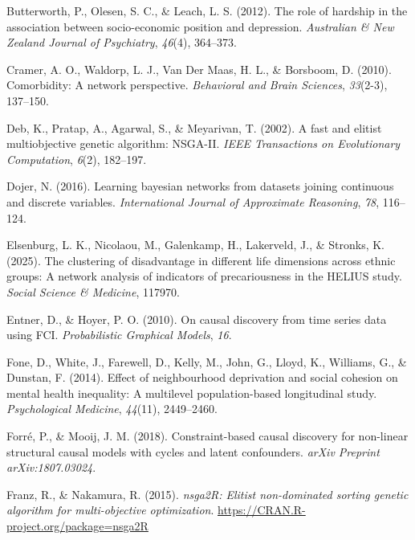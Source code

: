\documentclass[
]{article}
\newlength{\cslhangindent}
\newenvironment{CSLReferences}[2] %
 {\begin{list}{}{%
  \setlength{\itemindent}{0pt}
  \setlength{\leftmargin}{0pt}
  \setlength{\parsep}{0pt}
  \ifodd #1
   \setlength{\leftmargin}{\cslhangindent}
   \setlength{\itemindent}{-1\cslhangindent}
  \fi
  \setlength{\itemsep}{#2\baselineskip}}}
 {\end{list}}
\begin{document}
\label{refs}
\begin{CSLReferences}{1}{0}
Butterworth, P., Olesen, S. C., \& Leach, L. S. (2012). The role of
hardship in the association between socio-economic position and
depression. \emph{Australian \& New Zealand Journal of Psychiatry},
\emph{46}(4), 364--373.

Cramer, A. O., Waldorp, L. J., Van Der Maas, H. L., \& Borsboom, D.
(2010). Comorbidity: A network perspective. \emph{Behavioral and Brain
Sciences}, \emph{33}(2-3), 137--150.

Deb, K., Pratap, A., Agarwal, S., \& Meyarivan, T. (2002). A fast and
elitist multiobjective genetic algorithm: NSGA-II. \emph{IEEE
Transactions on Evolutionary Computation}, \emph{6}(2), 182--197.

Dojer, N. (2016). Learning bayesian networks from datasets joining
continuous and discrete variables. \emph{International Journal of
Approximate Reasoning}, \emph{78}, 116--124.

Elsenburg, L. K., Nicolaou, M., Galenkamp, H., Lakerveld, J., \&
Stronks, K. (2025). The clustering of disadvantage in different life
dimensions across ethnic groups: A network analysis of indicators of
precariousness in the HELIUS study. \emph{Social Science \& Medicine},
117970.

Entner, D., \& Hoyer, P. O. (2010). On causal discovery from time series
data using FCI. \emph{Probabilistic Graphical Models}, \emph{16}.

Fone, D., White, J., Farewell, D., Kelly, M., John, G., Lloyd, K.,
Williams, G., \& Dunstan, F. (2014). Effect of neighbourhood deprivation
and social cohesion on mental health inequality: A multilevel
population-based longitudinal study. \emph{Psychological Medicine},
\emph{44}(11), 2449--2460.

Forré, P., \& Mooij, J. M. (2018). Constraint-based causal discovery for
non-linear structural causal models with cycles and latent confounders.
\emph{arXiv Preprint arXiv:1807.03024}.

Franz, R., \& Nakamura, R. (2015). \emph{nsga2R: Elitist non-dominated
sorting genetic algorithm for multi-objective optimization}.
\url{https://CRAN.R-project.org/package=nsga2R}


\end{CSLReferences}
\end{document}
